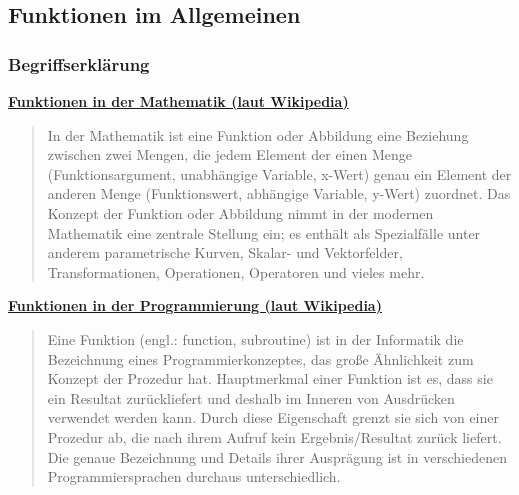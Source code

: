 
\subsection{Funktionen im Allgemeinen}

\subsubsection{\texorpdfstring{{Begriffserklärung}}{Begriffserklärung}}

\vspace{0.5cm}\par\noindent\textbf{\href{http://de.wikipedia.org/wiki/Funktion\%20(Mathematik)}{Funktionen\vspace{0.5cm}
in der Mathematik (laut Wikipedia)}}

\begin{quote}
In der Mathematik ist eine Funktion oder Abbildung eine Beziehung
zwischen zwei Mengen, die jedem Element der einen Menge
(Funktionsargument, unabhängige Variable, x-Wert) genau ein Element der
anderen Menge (Funktionswert, abhängige Variable, y-Wert) zuordnet. Das
Konzept der Funktion oder Abbildung nimmt in der modernen Mathematik
eine zentrale Stellung ein; es enthält als Spezialfälle unter anderem
parametrische Kurven, Skalar- und Vektorfelder, Transformationen,
Operationen, Operatoren und vieles mehr.
\end{quote}



\vspace{0.5cm}\par\noindent\textbf{\href{http://de.wikipedia.org/wiki/Funktion\%20(Programmierung)}{Funktionen\vspace{0.5cm}
in der Programmierung (laut Wikipedia)}}

\begin{quote}
Eine Funktion (engl.: function, subroutine) ist in der Informatik die
Bezeichnung eines Programmierkonzeptes, das große Ähnlichkeit zum
Konzept der Prozedur hat. Hauptmerkmal einer Funktion ist es, dass sie
ein Resultat zurückliefert und deshalb im Inneren von Ausdrücken
verwendet werden kann. Durch diese Eigenschaft grenzt sie sich von einer
Prozedur ab, die nach ihrem Aufruf kein Ergebnis/Resultat zurück
liefert. Die genaue Bezeichnung und Details ihrer Ausprägung ist in
verschiedenen Programmiersprachen durchaus unterschiedlich.
\end{quote}




